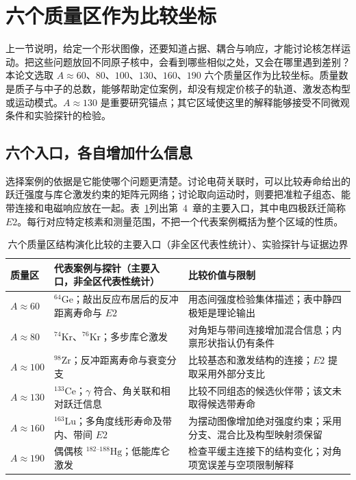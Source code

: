 \section{六个质量区作为比较坐标}\label{sec:1-4}

上一节说明，给定一个形状图像，还要知道占据、耦合与响应，才能讨论核怎样运动。把这些问题放回不同原子核中，会看到哪些相似之处，又会在哪里遇到差别？本论文选取 $A\approx 60$、$80$、$100$、$130$、$160$、$190$ 六个质量区作为比较坐标。质量数是质子与中子的总数，能够帮助定位案例，却没有规定价核子的轨道、激发态构型或运动模式。$A\approx 130$ 是重要研究锚点；其它区域使这里的解释能够接受不同微观条件和实验探针的检验。

\subsection{六个入口，各自增加什么信息}\label{sec:1-4-1}

选择案例的依据是它能使哪个问题更清楚。讨论电荷关联时，可以比较寿命给出的跃迁强度与库仑激发约束的矩阵元网络；讨论取向运动时，则要把准粒子组态、能带连接和电磁响应放在一起。表~\ref{tab:1-4-six-regions}列出第~4~章的主要入口，其中电四极跃迁简称 $E2$。每行对应特定核素和测量范围，不把一个代表案例概括为整个区域的性质。

\begin{table}[htbp]
\centering
\small
\caption{六个质量区结构演化比较的主要入口（非全区代表性统计）、实验探针与证据边界}\label{tab:1-4-six-regions}
\begin{tabularx}{\textwidth}{p{2.0cm}p{4.8cm}X}
\toprule
质量区 & 代表案例与探针（主要入口，非全区代表性统计） & 比较价值与限制 \\
\midrule
$A\approx 60$ & $^{64}\mathrm{Ge}$；敲出反应布居后的反冲距离寿命与 $E2$ & 用态间强度检验集体描述；表中静四极矩是理论输出~\cite{doctoral-r1-g26-starosta-2007-64ge-rdm-e2} \\
$A\approx 80$ & $^{74}\mathrm{Kr}$、$^{76}\mathrm{Kr}$；多步库仑激发 & 对角矩与带间连接增加混合信息；内禀形状指认仍有条件~\cite{doctoral-r1-g27-clement-2007-prc-krypton-coulex} \\
$A\approx 100$ & $^{98}\mathrm{Zr}$；反冲距离寿命与衰变分支 & 比较基态和激发结构的连接；$E2$ 提取采用外部分支比~\cite{doctoral-r1-g28-singh-2018-98zr-lifetimes} \\
$A\approx 130$ & $^{133}\mathrm{Ce}$；$\gamma$ 符合、角关联和相对跃迁信息 & 比较不同组态的候选伙伴带；该文未取得候选带寿命~\cite{ayangeakaa-2013-evidence-multiple-chiral-doublet-bands-133ce} \\
$A\approx 160$ & $^{163}\mathrm{Lu}$；多角度线形寿命及带内、带间 $E2$ & 为摆动图像增加绝对强度约束；采用分支、混合比及构型映射须保留~\cite{campaign-g07-gorgen-2004-163lu-quadrupole-moments} \\
$A\approx 190$ & 偶偶核 $^{182\text{--}188}\mathrm{Hg}$；低能库仑激发 & 检查平缓主连接下的结构变化；对角项宽误差与空项限制解释~\cite{doctoral-r1-g31-bree-2014-prl112-coulex-182-188hg} \\
\bottomrule
\end{tabularx}
\end{table}

